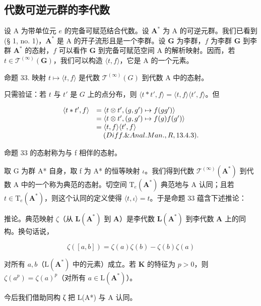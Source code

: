 \subsection{代数可逆元群的李代数}

设 A 为带单位元 \(e\) 的完备可赋范结合代数。设 \(\mathbf{A}^*\) 为 A 的可逆元群。我们已看到 (§ 1, no. 1)，\(\mathbf{A}^*\) 是 A 的开子流形且是一个李群。设 \(\mathbf{G}\) 为李群，\(f\) 为李群 \(\mathbf{G}\) 到李群 \(\mathbf{A}^*\) 的态射，\(f\) 可以看作 \(\mathbf{G}\) 到完备可赋范空间 A 的解析映射。因而，若 \(t \in \mathcal{T}^{(\infty)}(\mathbf{G})\)，我们可以构造 \(\langle t, f \rangle\)，它是 A 的一个元素。

命题 33. 映射 \(t \mapsto \langle t, f \rangle\) 是代数 \(\mathcal{T}^{(\infty)}(G)\) 到代数 A 中的态射。

只需验证：若 \(t\) 与 \(t'\) 是 \(G\) 上的点分布，则 \(\langle t * t', f \rangle = \langle t, f \rangle \langle t', f \rangle\)。但

\[
\begin{array}{r l} \langle t * t ^ {\prime}, f \rangle & = \langle t \otimes t ^ {\prime}, (g, g ^ {\prime}) \mapsto f (g g ^ {\prime}) \rangle \\ & = \langle t \otimes t ^ {\prime}, (g, g ^ {\prime}) \mapsto f (g) f (g ^ {\prime}) \rangle \\ & = \langle t, f \rangle \langle t ^ {\prime}, f \rangle \\ & \quad (Diff. \& Anal. Man., R, 13.4.3). \end{array}
\]

命题 33 的态射称为与 f 相伴的态射。

取 G 为群 A* 自身，取 f 为 A* 的恒等映射 \(\iota\)。我们得到代数 \(\mathcal{T}^{(\infty)}(\mathbf{A}^*)\) 到代数 A 中的一个称为典范的态射。切空间 \(\mathrm{T}_{e}(\mathbf{A}^*)\) 典范地与 A 认同；且若 \(t \in \mathrm{T}_{e}(\mathbf{A}^*)\)，则这个认同的定义使得 \(\langle t, \iota \rangle = t\)。于是命题 33 蕴含下述推论：

推论。典范映射 \(\zeta\)（从 \(\mathbf{L}(\mathbf{A}^{*})\) 到 \(\mathbf{A}\)）是李代数 \(\mathbf{L}(\mathbf{A}^{*})\) 到李代数 \(\mathbf{A}\) 上的同构。换句话说，

\[
\zeta ([ a, b ]) = \zeta (a) \zeta (b) - \zeta (b) \zeta (a)
\]

对所有 \(a, b\)（\(\mathrm{L}(\mathbf{A}^*)\) 中的元素）成立。若 \(\mathbf{K}\) 的特征为 \(p > 0\)，则 \(\zeta(a^p) = \zeta(a)^p\)（对所有 \(a \in \mathrm{L}(\mathbf{A}^*)\)）。

今后我们借助同构 ζ 把 L(A*) 与 A 认同。

